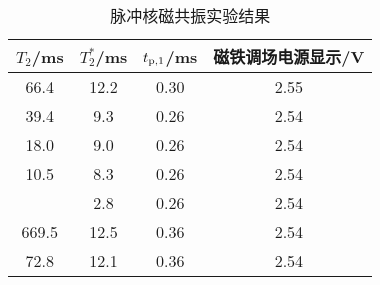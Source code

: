 \begin{table}[htbp!]
	\centering
	\caption{脉冲核磁共振实验结果}\label{tab:Pulse}	\begin{tabular}{c||c|c|c}
		\hline\hline
		$T_2$/ms & $T_2^*$/ms & $t_{\rm p,1}$/ms & 磁铁调场电源显示/V\\		\hline\hline
		66.4  & 12.2  & 0.30  & 2.55 \\		\hline
		39.4  & 9.3  & 0.26  & 2.54 \\		\hline
		18.0  & 9.0  & 0.26  & 2.54 \\		\hline
		10.5  & 8.3  & 0.26  & 2.54 \\		\hline
		 & 2.8  & 0.26  & 2.54 \\		\hline
		669.5  & 12.5  & 0.36  & 2.54 \\		\hline
		72.8  & 12.1  & 0.36  & 2.54 \\		\hline\hline
	\end{tabular}
\end{table}